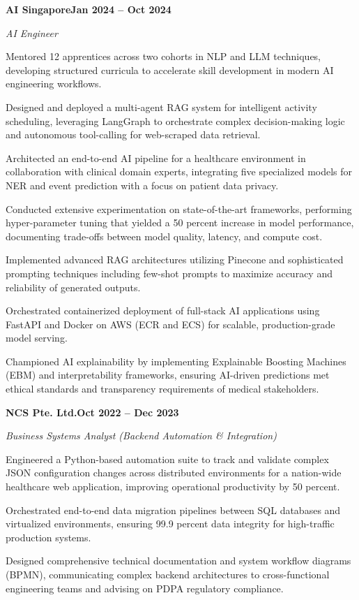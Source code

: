 \documentclass[letterpaper,10pt]{article}
\newcommand{\headingBf}[2]{\par\noindent\hspace*{10pt}\textbf{#1}\hfill\textbf{#2}}
\newcommand{\headingIt}[2]{\par\noindent\hspace*{10pt}\textit{#1}\hfill\textit{#2}}
\newenvironment{resume_list}{\vspace{-7pt}\begin{itemize}[itemsep=-2px, parsep=1pt, leftmargin=30pt]}{\end{itemize}}
\begin{document}
  \headingBf{AI Singapore}{Jan 2024 -- Oct 2024}
  \headingIt{AI Engineer}{}
  \begin{resume_list}
    \item Mentored 12 apprentices across two cohorts in NLP and LLM techniques, developing structured curricula to accelerate skill development in modern AI engineering workflows.
    \item Designed and deployed a multi-agent RAG system for intelligent activity scheduling, leveraging LangGraph to orchestrate complex decision-making logic and autonomous tool-calling for web-scraped data retrieval.
    \item Architected an end-to-end AI pipeline for a healthcare environment in collaboration with clinical domain experts, integrating five specialized models for NER and event prediction with a focus on patient data privacy.
    \item Conducted extensive experimentation on state-of-the-art frameworks, performing hyper-parameter tuning that yielded a 50 percent increase in model performance, documenting trade-offs between model quality, latency, and compute cost.
    \item Implemented advanced RAG architectures utilizing Pinecone and sophisticated prompting techniques including few-shot prompts to maximize accuracy and reliability of generated outputs.
    \item Orchestrated containerized deployment of full-stack AI applications using FastAPI and Docker on AWS (ECR and ECS) for scalable, production-grade model serving.
    \item Championed AI explainability by implementing Explainable Boosting Machines (EBM) and interpretability frameworks, ensuring AI-driven predictions met ethical standards and transparency requirements of medical stakeholders.
  \end{resume_list}

  \headingBf{NCS Pte. Ltd.}{Oct 2022 -- Dec 2023}
  \headingIt{Business Systems Analyst (Backend Automation \& Integration)}{}
  \begin{resume_list}
    \item Engineered a Python-based automation suite to track and validate complex JSON configuration changes across distributed environments for a nation-wide healthcare web application, improving operational productivity by 50 percent.
    \item Orchestrated end-to-end data migration pipelines between SQL databases and virtualized environments, ensuring 99.9 percent data integrity for high-traffic production systems.
    \item Designed comprehensive technical documentation and system workflow diagrams (BPMN), communicating complex backend architectures to cross-functional engineering teams and advising on PDPA regulatory compliance.
  \end{resume_list}
\end{document}
